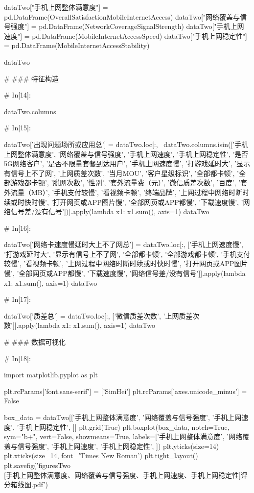 \documentclass{MathorCupmodeling}
\begin{document}
\begin{python}
	dataTwo["手机上网整体满意度"] = pd.DataFrame(OverallSatisfactionMobileInternetAccess)
	dataTwo["网络覆盖与信号强度"] = pd.DataFrame(NetworkCoverageSignalStrength)
	dataTwo["手机上网速度"] = pd.DataFrame(MobileInternetAccessSpeed)
	dataTwo["手机上网稳定性"] = pd.DataFrame(MobileInternetAccessStability)
	
	dataTwo
	
	# ### 特征构造
	
	# In[14]:
	
	
	dataTwo.columns
	
	# In[15]:
	
	
	dataTwo['出现问题场所或应用总'] = dataTwo.loc[:, ~dataTwo.columns.isin(['手机上网整体满意度', '网络覆盖与信号强度', '手机上网速度', '手机上网稳定性', '是否5G网络客户', '是否不限量套餐到达用户', '手机上网速度慢', '打游戏延时大', '显示有信号上不了网', '上网质差次数', '当月MOU', '客户星级标识', '全部都卡顿', '全部游戏都卡顿', '脱网次数', '性别', '套外流量费（元）', '微信质差次数', '百度', '套外流量（MB）', '手机支付较慢', '看视频卡顿', '终端品牌', '上网过程中网络时断时续或时快时慢', '打开网页或APP图片慢', '全部网页或APP都慢', '下载速度慢', '网络信号差/没有信号'])].apply(lambda x1: x1.sum(), axis=1)
	dataTwo
	
	# In[16]:
	
	
	dataTwo['网络卡速度慢延时大上不了网总'] = dataTwo.loc[:, ['手机上网速度慢', '打游戏延时大', '显示有信号上不了网', '全部都卡顿', '全部游戏都卡顿', '手机支付较慢', '看视频卡顿', '上网过程中网络时断时续或时快时慢', '打开网页或APP图片慢', '全部网页或APP都慢', '下载速度慢', '网络信号差/没有信号']].apply(lambda x1: x1.sum(), axis=1)
	dataTwo
	
	# In[17]:
	
	
	dataTwo['质差总'] = dataTwo.loc[:, ['微信质差次数', '上网质差次数']].apply(lambda x1: x1.sum(), axis=1)
	dataTwo
	
	# ### 数据可视化
	
	# In[18]:
	
	
	import matplotlib.pyplot as plt
	
	plt.rcParams['font.sans-serif'] = ['SimHei']
	plt.rcParams['axes.unicode_minus'] = False
	
	box_data = dataTwo[['手机上网整体满意度', '网络覆盖与信号强度', '手机上网速度', '手机上网稳定性', ]]
	plt.grid(True)
	plt.boxplot(box_data,
				notch=True,
				sym="b+",
				vert=False,
				showmeans=True,
				labels=['手机上网整体满意度', '网络覆盖与信号强度', '手机上网速度', '手机上网稳定性', ])
	plt.yticks(size=14)
	plt.xticks(size=14, font='Times New Roman')
	plt.tight_layout()
	plt.savefig('figuresTwo\\[附件2][手机上网整体满意度、网络覆盖与信号强度、手机上网速度、手机上网稳定性]评分箱线图.pdf')
	

\end{python}
\end{document}
